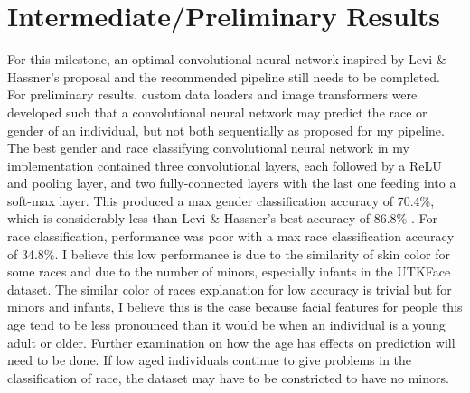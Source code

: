\documentclass[10pt,twocolumn,letterpaper]{article}
\begin{document}
\section{Intermediate/Preliminary Results}
For this milestone, an optimal convolutional neural network inspired by Levi \& Hassner’s proposal and the recommended pipeline still needs to be completed. For preliminary results, custom data loaders and image transformers were developed such that a convolutional neural network may predict the race or gender of an individual, but not both sequentially as proposed for my pipeline. The best gender and race classifying convolutional neural network in my implementation contained three convolutional layers, each followed by a ReLU and pooling layer, and two fully-connected layers with the last one feeding into a soft-max layer. This produced a max gender classification accuracy of 70.4\%, which is considerably less than Levi \& Hassner’s best accuracy of 86.8\% \cite{Authors14b}. For race classification, performance was poor with a max race classification accuracy of 34.8\%. I believe this low performance is due to the similarity of skin color for some races and due to the number of minors, especially infants in the UTKFace dataset. The similar color of races explanation for low accuracy is trivial but for minors and infants, I believe this is the case because facial features for people this age tend to be less pronounced than it would be when an individual is a young adult or older. Further examination on how the age has effects on prediction will need to be done. If low aged individuals continue to give problems in the classification of race, the dataset may have to be constricted to have no minors.

{\small


}
\end{document}
